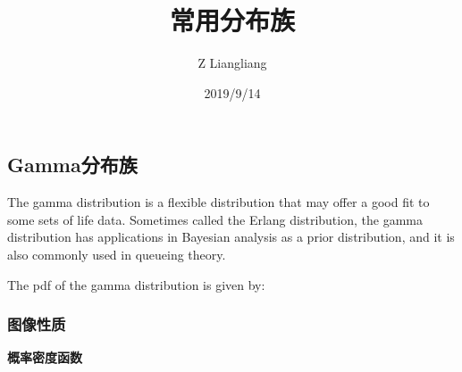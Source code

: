 \documentclass[]{article}
\title{常用分布族}
\author{Z Liangliang}
\date{2019/9/14}
\begin{document}
\maketitle

\hypertarget{gamma}{%
\subsection{Gamma分布族}\label{gamma}}

The gamma distribution is a flexible distribution that may offer a good
fit to some sets of life data. Sometimes called the Erlang distribution,
the gamma distribution has applications in Bayesian analysis as a prior
distribution, and it is also commonly used in queueing theory.

The pdf of the gamma distribution is given by:

\hypertarget{section}{%
\subsubsection{图像性质}\label{section}}

\textbf{概率密度函数}
\end{document}
